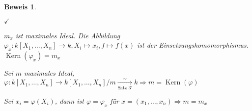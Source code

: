 \documentclass[a4paper, 12pt, numbers=noendperiod, chapterprefix=true, headsepline]{scrbook}
\theoremstyle{break}
\theoremstyle{nonumberbreak}
\newtheorem{Bew}{Beweis}
\theoremstyle{nonumberplain}
\DeclareMathOperator{\Kern}{Kern}
\begin{document}
\begin{Bew}\begin{description}[\setlabelstyle{\normalfont}]
\item[(i)$\Rightarrow $(ii):] $\checkmark$

\item[(ii)$\Rightarrow $(iii):]
	$m_x$ ist maximales Ideal. Die Abbildung $\varphi_x:k[X_1,\dots ,X_n]\to k, X_i\mapsto x_i, f\mapsto f(x)$ ist der Einsetzungshomomorphismus. $\Kern(\varphi_x)=m_x$

\item[(iii)$\Rightarrow $(i):]
	Sei $m$ maximales Ideal, $\varphi:k[X_1,\dots ,X_n]\to k[X_1,\dots ,X_n]/m  \xrightarrow[\textrm{Satz 3'}]{\sim} k \Rightarrow m=\Kern(\varphi)$
	
	Sei $x_i=\varphi(X_i)$, dann ist $\varphi=\varphi_x$ f\"ur $x=(x_1,\dots ,x_n) \Rightarrow m=m_x$
\end{description}\end{Bew}
\end{document}
